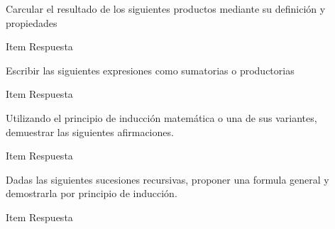 \documentclass{template_practica}
\begin{document}
\begin{enumerate}
\begin{enumcols}
	\end{enumcols}

	\exercise Carcular el resultado de los siguientes productos mediante su definición y propiedades

	\exercise Escribir las siguientes expresiones como sumatorias o productorias

	\exercise Utilizando el principio de inducción matemática o una de sus variantes, demuestrar las siguientes afirmaciones.

	\exercise Dadas las siguientes sucesiones recursivas, proponer una formula general y demostrarla por principio de inducción.

\end{enumerate}
\end{document}
